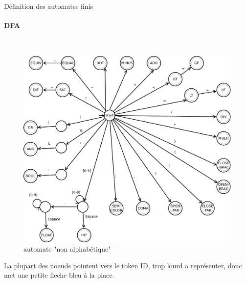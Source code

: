 \documentclass[a4paper,10pt]{article}
\begin{document}
Définition des automates finis
~\\
\paragraph{DFA}~\\

 \begin{figure}[H] \hspace*{-2cm} 
    \centering
   	  \includegraphics[width=400pt]{automate1.pdf} 
			\caption{automate "non alphabétique"}
			\label{automate1}
  \end{figure}	
  
	La plupart des noeuds pointent vers le token ID, trop lourd a représenter, donc met une petite fleche bleu à la place.  
  
\end{document}
